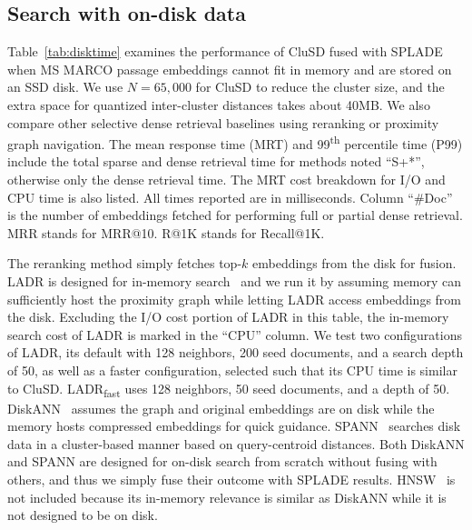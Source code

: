\subsection{ Search with on-disk data}
\label{sect:evaldisk}

Table~\ref{tab:disktime} examines the performance  of CluSD fused with SPLADE when MS MARCO passage 
embeddings cannot fit in memory and are stored on an SSD disk.
We use  $N=65,000$ for CluSD to reduce the cluster size, and the extra space for quantized inter-cluster distances takes about 40MB. 
We also compare other selective dense retrieval baselines using  reranking or proximity graph navigation.
The mean response time (MRT) and 99\textsuperscript{th} percentile time (P99) include
the total sparse and dense retrieval time for methods noted ``S+*'', otherwise only the dense retrieval time.
The MRT cost breakdown for I/O and CPU time is also listed. 
All times reported are in milliseconds. 
Column ``\#Doc'' is the number of embeddings fetched for performing full or partial dense retrieval.
MRR stands for MRR@10.
R@1K stands for Recall@1K.

The reranking method simply fetches top-$k$ embeddings  from the disk for fusion. 
LADR is designed for in-memory search~\cite{2023SIGIR-LADR} and we run it by  assuming  memory can sufficiently host the proximity  graph while letting LADR access  embeddings from the disk. 
Excluding the I/O cost portion of LADR in this table, the in-memory search cost of LADR is marked in the ``CPU'' column.
We test two configurations of LADR, its default with 128 neighbors, 200 seed documents, and a search depth of 50,
as well as a faster configuration, selected such that its CPU time is similar to CluSD. 
LADR\textsubscript{fast} uses 128 neighbors, 50 seed documents, and a depth of 50.
DiskANN~\cite{NEURIPS2019_DiskANN} assumes the graph and original embeddings are on disk  while the memory  hosts
compressed embeddings for quick guidance.  SPANN~\cite{chen2021spann} searches disk data in a cluster-based manner based on query-centroid distances.
Both DiskANN and SPANN  are designed for on-disk search from scratch without fusing with others, and thus we simply fuse their outcome with SPLADE results.
HNSW~\cite{2020TPAMI-HNSW} is not included because its in-memory relevance  is similar as DiskANN while it is not designed to be on disk. 

